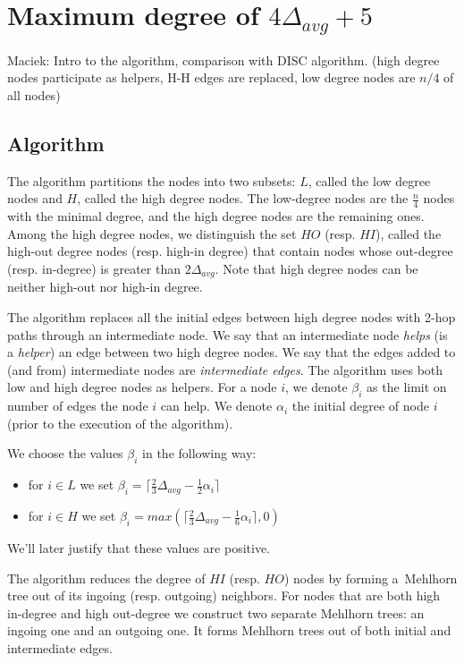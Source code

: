 \documentclass{article}
\begin{document}
\section{Maximum degree of $4\Delta_{avg} + 5$}

Maciek: Intro to the algorithm, comparison with DISC algorithm.
(high degree nodes participate as helpers, H-H edges are replaced, low degree nodes are $n/4$ of all nodes)

\subsection{Algorithm}

The algorithm partitions the nodes into two subsets: $L$, called the low degree nodes and $H$, called
the high degree nodes. The low-degree nodes are
the $\frac{n}{4}$ nodes with the minimal degree, and the high degree nodes
are the remaining ones.
Among the high degree nodes, we distinguish the set $HO$ (resp. $HI$), called the high-out degree nodes (resp. high-in degree) that contain nodes whose out-degree (resp. in-degree) is greater than
$2\Delta_{avg}$.
Note that high degree nodes can be neither high-out nor high-in degree.

The algorithm replaces all the initial edges between high degree nodes with 2-hop paths through an intermediate node.
We say that an intermediate node \emph{helps} (is a \emph{helper}) an edge between two high degree nodes.
We say that the edges added to (and from) intermediate nodes are \emph{intermediate edges}.
The algorithm uses both low and high degree nodes as helpers.
For a node $i$, we denote $\beta_i$ as the limit on number of edges the node $i$ can help.
We denote $\alpha_i$ the initial degree of node $i$ (prior to the execution of the algorithm).

We choose the values $\beta_i$ in the following way:
\begin{itemize}
  \item for $i \in L$ we set
  $\beta_i = \lceil\frac{2}{3}\Delta_{avg}-\frac{1}{2}\alpha_i\rceil$
  \item for $i \in H$ we set
  $\beta_i = max(\lceil\frac{2}{3}\Delta_{avg}-\frac{1}{6}\alpha_i\rceil, 0)$
\end{itemize}
We'll later justify that these values are positive.

The algorithm reduces the degree of $HI$ (resp. $HO$) nodes by forming a~Mehlhorn tree out of its ingoing (resp. outgoing) neighbors.
For nodes that are both high in-degree and high out-degree we construct two separate Mehlhorn trees: an ingoing one and an outgoing one.
It forms Mehlhorn trees out of both initial and intermediate edges.
\end{document}
